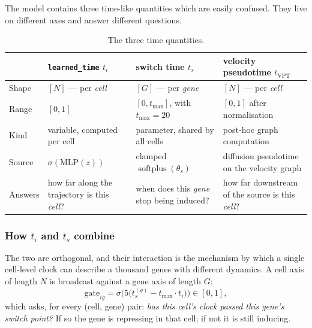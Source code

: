 \documentclass[11pt,a4paper]{article}
\newcommand{\ts}{t_{s}}
\newcommand{\tmax}{t_{\max}}
\newcommand{\softplus}{\operatorname{softplus}}
\theoremstyle{definition}
\begin{document}
The model contains three time-like quantities which are easily confused. They
live on different axes and answer different questions.

\begin{table}[h]
\centering
\caption{The three time quantities.}
\label{tab:times}
\small
\begin{tabular}{@{}p{2.3cm}p{3.9cm}p{3.9cm}p{4.4cm}@{}}
\toprule
 & \texttt{learned\_time} $t_i$ & switch time $\ts$ & velocity pseudotime $t_{\text{VPT}}$ \\
\midrule
Shape   & $[N]$ --- per \emph{cell} & $[G]$ --- per \emph{gene} & $[N]$ --- per \emph{cell} \\
Range   & $[0,1]$ & $[0, \tmax]$, with $\tmax = 20$ & $[0,1]$ after normalisation \\
Kind    & variable, computed per cell & parameter, shared by all cells & post-hoc graph computation \\
Source  & $\sigma(\mathrm{MLP}(z))$ & clamped $\softplus(\theta_s)$ & diffusion pseudotime on the velocity graph \\
Answers & how far along the trajectory is this \emph{cell}? & when does this \emph{gene} stop being induced? & how far downstream of the source is this \emph{cell}? \\
\bottomrule
\end{tabular}
\end{table}

\subsubsection{How \texorpdfstring{$t_i$}{t\_i} and \texorpdfstring{$\ts$}{t\_s} combine}

The two are orthogonal, and their interaction is the mechanism by which a
single cell-level clock can describe a thousand genes with different dynamics.
A cell axis of length $N$ is broadcast against a gene axis of length $G$:
%
\begin{equation}
\text{gate}_{ig} = \sigma\Big(5\big(\ts^{(g)} - \tmax \cdot t_i\big)\Big) \in [0,1],
\end{equation}
%
which asks, for every (cell, gene) pair: \emph{has this cell's clock passed this
gene's switch point?} If so the gene is repressing in that cell; if not it is
still inducing.
\end{document}

